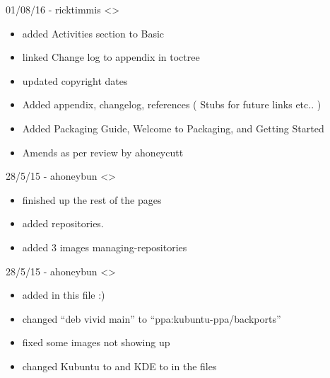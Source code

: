 \documentclass[letterpaper,10pt,english]{sphinxmanual}
\begin{document}
01/08/16 - ricktimmis \textless{}\textgreater{}
\begin{itemize}
\item {} 
added Activities section to Basic

\item {} 
linked Change log to appendix in toctree

\item {} 
updated copyright dates

\item {} 
Added appendix, changelog, references ( Stubs for future links etc.. )

\item {} 
Added Packaging Guide, Welcome to Packaging, and Getting Started

\item {} 
Amends as per review by ahoneycutt

\end{itemize}

28/5/15 - ahoneybun \textless{}\textgreater{}
\begin{itemize}
\item {} 
finished up the rest of the pages

\item {} 
added repositories.

\item {} 
added 3 images managing-repositories

\end{itemize}

28/5/15 - ahoneybun \textless{}\textgreater{}
\begin{itemize}
\item {} 
added in this file :)

\item {} 
changed “deb  vivid main” to “ppa:kubuntu-ppa/backports”

\item {} 
fixed some images not showing up

\item {} 
changed Kubuntu to  and KDE to  in the files

\end{itemize}
\end{document}
